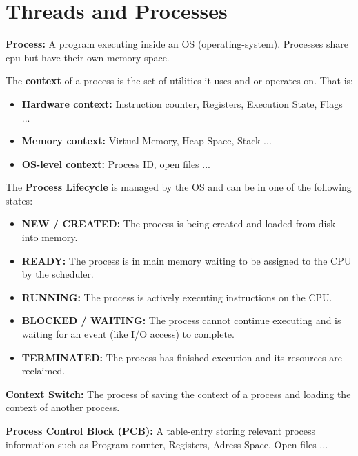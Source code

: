 \section{Threads and Processes}

\begin{definition}
    \textbf{Process: } A program executing inside an OS (operating-system). Processes share cpu but have their own memory space.
\end{definition}

\begin{definition}
The \textbf{context} of a process is the set of utilities it uses and or operates on. That is:
\begin{itemize}
    \item \textbf{Hardware context: }Instruction counter, Registers, Execution State, Flags ...
    \item \textbf{Memory context: }Virtual Memory, Heap-Space, Stack ...
    \item \textbf{OS-level context:} Process ID, open files ...
\end{itemize}
\end{definition}

The \textbf{Process Lifecycle} is managed by the OS and can be in one of the following states:
\begin{itemize}
    \item \textbf{NEW / CREATED:} The process is being created and loaded from disk into memory.
    \item \textbf{READY:} The process is in main memory waiting to be assigned to the CPU by the scheduler.
    \item \textbf{RUNNING:} The process is actively executing instructions on the CPU.
    \item \textbf{BLOCKED / WAITING:} The process cannot continue executing and is waiting for an event (like I/O access) to complete.
    \item \textbf{TERMINATED:} The process has finished execution and its resources are reclaimed.
\end{itemize}

\begin{definition}
\textbf{Context Switch:} The process of saving the context of a process and loading the context of another process.
\end{definition}

\begin{definition}
\textbf{Process Control Block (PCB):} A table-entry storing relevant process information such as Program counter, Registers, Adress Space, Open files ...
\end{definition}

